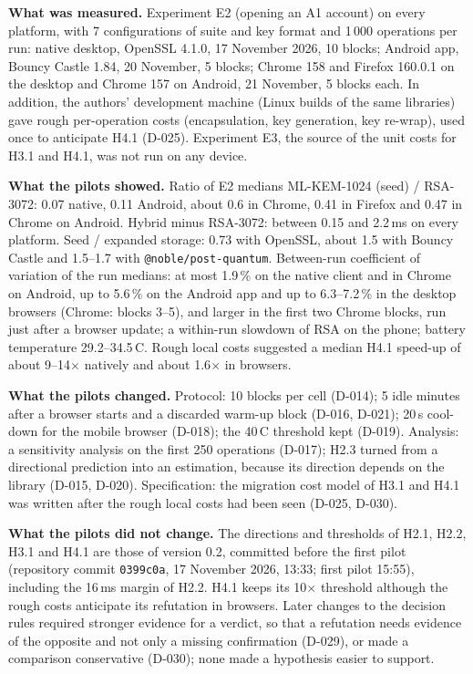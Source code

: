 \documentclass[11pt,a4paper]{article}
\begin{document}
\textbf{What was measured.} Experiment E2 (opening an A1 account) on every platform, with 7 configurations of suite and key format and 1\,000 operations per run: native desktop, OpenSSL 4.1.0, 17 November 2026, 10 blocks; Android app, Bouncy Castle 1.84, 20 November, 5 blocks; Chrome 158 and Firefox 160.0.1 on the desktop and Chrome 157 on Android, 21 November, 5 blocks each. In addition, the authors' development machine (Linux builds of the same libraries) gave rough per-operation costs (encapsulation, key generation, key re-wrap), used once to anticipate H4.1 (D-025). Experiment E3, the source of the unit costs for H3.1 and H4.1, was not run on any device.

\textbf{What the pilots showed.} Ratio of E2 medians ML-KEM-1024 (seed) / RSA-3072: 0.07 native, 0.11 Android, about 0.6 in Chrome, 0.41 in Firefox and 0.47 in Chrome on Android. Hybrid minus RSA-3072: between 0.15 and 2.2\,ms on every platform. Seed / expanded storage: 0.73 with OpenSSL, about 1.5 with Bouncy Castle and 1.5--1.7 with \texttt{@noble/post-quantum}. Between-run coefficient of variation of the run medians: at most 1.9\,\% on the native client and in Chrome on Android, up to 5.6\,\% on the Android app and up to 6.3--7.2\,\% in the desktop browsers (Chrome: blocks 3--5), and larger in the first two Chrome blocks, run just after a browser update; a within-run slowdown of RSA on the phone; battery temperature 29.2--34.5\,\textdegree C. Rough local costs suggested a median H4.1 speed-up of about 9--14$\times$ natively and about 1.6$\times$ in browsers.

\textbf{What the pilots changed.} Protocol: 10 blocks per cell (D-014); 5 idle minutes after a browser starts and a discarded warm-up block (D-016, D-021); 20\,s cool-down for the mobile browser (D-018); the 40\,\textdegree C threshold kept (D-019). Analysis: a sensitivity analysis on the first 250 operations (D-017); H2.3 turned from a directional prediction into an estimation, because its direction depends on the library (D-015, D-020). Specification: the migration cost model of H3.1 and H4.1 was written after the rough local costs had been seen (D-025, D-030).

\textbf{What the pilots did not change.} The directions and thresholds of H2.1, H2.2, H3.1 and H4.1 are those of version 0.2, committed before the first pilot (repository commit \texttt{0399c0a}, 17 November 2026, 13:33; first pilot 15:55), including the 16\,ms margin of H2.2. H4.1 keeps its 10$\times$ threshold although the rough costs anticipate its refutation in browsers. Later changes to the decision rules required stronger evidence for a verdict, so that a refutation needs evidence of the opposite and not only a missing confirmation (D-029), or made a comparison conservative (D-030); none made a hypothesis easier to support.
\end{document}
